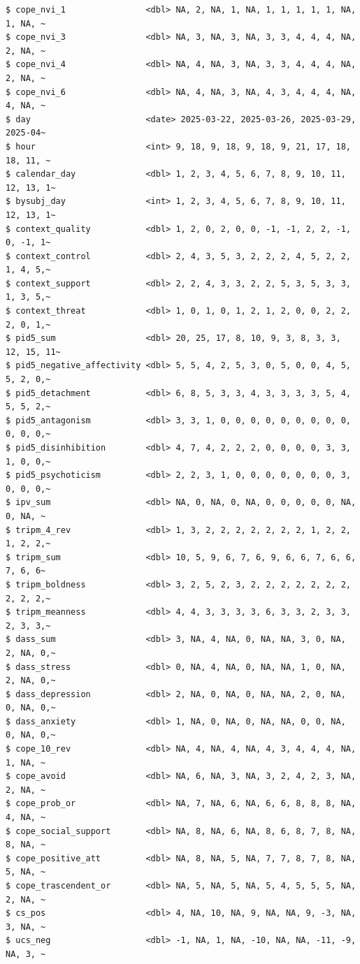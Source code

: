 \documentclass[
  11pt,
  a4paper,
  onecolumn]{article}
\begin{document}
\begin{verbatim}
$ cope_nvi_1                <dbl> NA, 2, NA, 1, NA, 1, 1, 1, 1, 1, NA, 1, NA, ~
$ cope_nvi_3                <dbl> NA, 3, NA, 3, NA, 3, 3, 4, 4, 4, NA, 2, NA, ~
$ cope_nvi_4                <dbl> NA, 4, NA, 3, NA, 3, 3, 4, 4, 4, NA, 2, NA, ~
$ cope_nvi_6                <dbl> NA, 4, NA, 3, NA, 4, 3, 4, 4, 4, NA, 4, NA, ~
$ day                       <date> 2025-03-22, 2025-03-26, 2025-03-29, 2025-04~
$ hour                      <int> 9, 18, 9, 18, 9, 18, 9, 21, 17, 18, 18, 11, ~
$ calendar_day              <dbl> 1, 2, 3, 4, 5, 6, 7, 8, 9, 10, 11, 12, 13, 1~
$ bysubj_day                <int> 1, 2, 3, 4, 5, 6, 7, 8, 9, 10, 11, 12, 13, 1~
$ context_quality           <dbl> 1, 2, 0, 2, 0, 0, -1, -1, 2, 2, -1, 0, -1, 1~
$ context_control           <dbl> 2, 4, 3, 5, 3, 2, 2, 2, 4, 5, 2, 2, 1, 4, 5,~
$ context_support           <dbl> 2, 2, 4, 3, 3, 2, 2, 5, 3, 5, 3, 3, 1, 3, 5,~
$ context_threat            <dbl> 1, 0, 1, 0, 1, 2, 1, 2, 0, 0, 2, 2, 2, 0, 1,~
$ pid5_sum                  <dbl> 20, 25, 17, 8, 10, 9, 3, 8, 3, 3, 12, 15, 11~
$ pid5_negative_affectivity <dbl> 5, 5, 4, 2, 5, 3, 0, 5, 0, 0, 4, 5, 5, 2, 0,~
$ pid5_detachment           <dbl> 6, 8, 5, 3, 3, 4, 3, 3, 3, 3, 5, 4, 5, 5, 2,~
$ pid5_antagonism           <dbl> 3, 3, 1, 0, 0, 0, 0, 0, 0, 0, 0, 0, 0, 0, 0,~
$ pid5_disinhibition        <dbl> 4, 7, 4, 2, 2, 2, 0, 0, 0, 0, 3, 3, 1, 0, 0,~
$ pid5_psychoticism         <dbl> 2, 2, 3, 1, 0, 0, 0, 0, 0, 0, 0, 3, 0, 0, 0,~
$ ipv_sum                   <dbl> NA, 0, NA, 0, NA, 0, 0, 0, 0, 0, NA, 0, NA, ~
$ tripm_4_rev               <dbl> 1, 3, 2, 2, 2, 2, 2, 2, 2, 1, 2, 2, 1, 2, 2,~
$ tripm_sum                 <dbl> 10, 5, 9, 6, 7, 6, 9, 6, 6, 7, 6, 6, 7, 6, 6~
$ tripm_boldness            <dbl> 3, 2, 5, 2, 3, 2, 2, 2, 2, 2, 2, 2, 2, 2, 2,~
$ tripm_meanness            <dbl> 4, 4, 3, 3, 3, 3, 6, 3, 3, 2, 3, 3, 2, 3, 3,~
$ dass_sum                  <dbl> 3, NA, 4, NA, 0, NA, NA, 3, 0, NA, 2, NA, 0,~
$ dass_stress               <dbl> 0, NA, 4, NA, 0, NA, NA, 1, 0, NA, 2, NA, 0,~
$ dass_depression           <dbl> 2, NA, 0, NA, 0, NA, NA, 2, 0, NA, 0, NA, 0,~
$ dass_anxiety              <dbl> 1, NA, 0, NA, 0, NA, NA, 0, 0, NA, 0, NA, 0,~
$ cope_10_rev               <dbl> NA, 4, NA, 4, NA, 4, 3, 4, 4, 4, NA, 1, NA, ~
$ cope_avoid                <dbl> NA, 6, NA, 3, NA, 3, 2, 4, 2, 3, NA, 2, NA, ~
$ cope_prob_or              <dbl> NA, 7, NA, 6, NA, 6, 6, 8, 8, 8, NA, 4, NA, ~
$ cope_social_support       <dbl> NA, 8, NA, 6, NA, 8, 6, 8, 7, 8, NA, 8, NA, ~
$ cope_positive_att         <dbl> NA, 8, NA, 5, NA, 7, 7, 8, 7, 8, NA, 5, NA, ~
$ cope_trascendent_or       <dbl> NA, 5, NA, 5, NA, 5, 4, 5, 5, 5, NA, 2, NA, ~
$ cs_pos                    <dbl> 4, NA, 10, NA, 9, NA, NA, 9, -3, NA, 3, NA, ~
$ ucs_neg                   <dbl> -1, NA, 1, NA, -10, NA, NA, -11, -9, NA, 3, ~
\end{verbatim}
\end{document}
